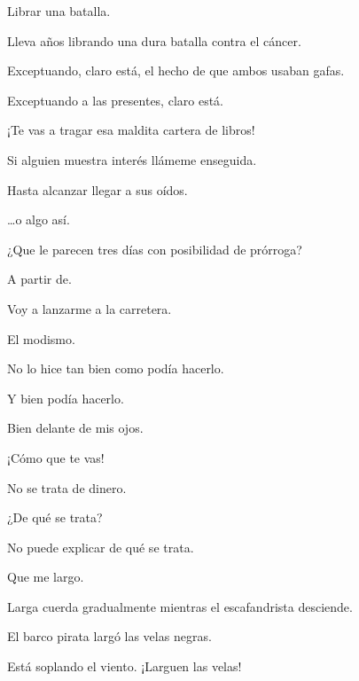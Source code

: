 \sk
Librar una batalla. 

\sk
Lleva años librando una dura batalla contra el cáncer. 

\sk
Exceptuando, claro está, el hecho de que ambos usaban gafas. 

\sk
Exceptuando a las presentes, claro está. 

\sk
¡Te vas a tragar esa maldita cartera de libros! 

\sk
Si alguien muestra interés llámeme enseguida. 

\sk
Hasta alcanzar llegar a sus oídos. 

\sk
\ldots{}o algo así. 

\sk
¿Que le parecen tres días con posibilidad de prórroga? 

\sk
A partir de. 

\sk
Voy a lanzarme a la carretera. 

\sk
El modismo. 

\sk
No lo hice tan bien como podía hacerlo. 

\sk
Y bien podía hacerlo. 

\sk
Bien delante de mis ojos. 

\sk
¡Cómo que te vas! 

\sk
No se trata de dinero. 

\sk
¿De qué se trata? 

\sk
No puede explicar de qué se trata. \nb{}

\sk
Que me largo. 

\sk
Larga cuerda gradualmente mientras el escafandrista desciende. 

\sk
El barco pirata largó las velas negras. 

\sk
Está soplando el viento. ¡Larguen las velas! 


